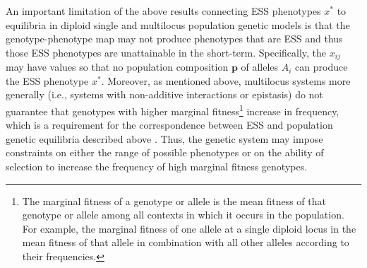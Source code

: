 \documentclass[11pt]{article}
\newcommand{\ess}[1]{#1^*}
\renewcommand{\vec}[1]{\symbf{#1}}
\begin{document}
An important limitation of the above results connecting ESS phenotypes $\ess{x}$ to equilibria in diploid single and multilocus population genetic models is that the genotype-phenotype map may not produce phenotypes that are ESS and thus those ESS phenotypes are unattainable in the short-term. Specifically, the $x_{ij}$ may have values so that no population composition $\vec{p}$ of alleles $A_{i}$ can produce the ESS phenotype $\ess{x}$. Moreover, as mentioned above, multilocus systems more generally (i.e., systems with non-additive interactions or epistasis) do not guarantee that genotypes with higher marginal fitness\footnote{The marginal fitness of a genotype or allele is the mean fitness of that genotype or allele among all contexts in which it occurs in the population. For example, the marginal fitness of one allele at a single diploid locus in the mean fitness of that allele in combination with all other alleles according to their frequencies.} increase in frequency, which is a requirement for the correspondence between ESS and population genetic equilibria described above \cite{Eshel:1982,Hofbauer:Sigmund:1998}. Thus, the genetic system may impose constraints on either the range of possible phenotypes or on the ability of selection to increase the frequency of high marginal fitness genotypes.
\end{document}
